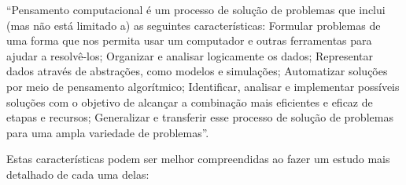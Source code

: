 \documentclass[12pt, openright, a4paper, brazil, english, french, spanish, bibjustif, openany, oneside]{abntex2}
\begin{document}
\begin{citacao}

``Pensamento computacional é um processo de solução de problemas que inclui (mas não está limitado a) as seguintes características: Formular problemas de uma forma que nos permita usar um computador e outras ferramentas para ajudar a resolvê-los; Organizar e analisar logicamente os dados; Representar dados através de abstrações, como modelos e simulações; Automatizar soluções por meio de pensamento algorítmico; Identificar, analisar e implementar possíveis soluções com o objetivo de alcançar a combinação mais eficientes e eficaz de etapas e recursos; Generalizar e transferir esse processo de solução de problemas para uma ampla variedade de problemas''\cite{iste/csta}.

\end{citacao}

Estas características podem ser melhor compreendidas ao fazer um estudo mais detalhado de cada uma delas:
\end{document}
